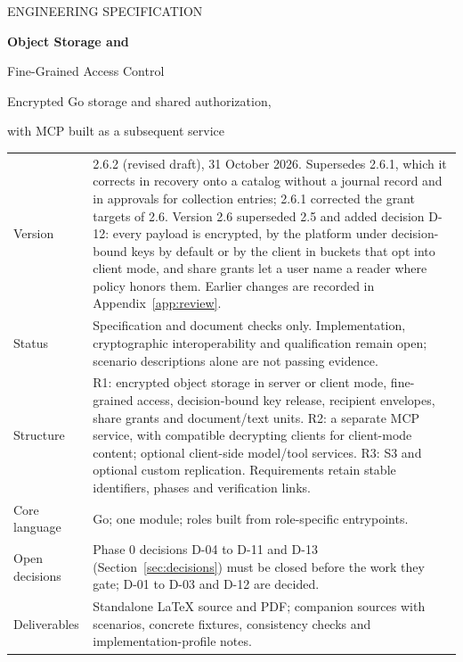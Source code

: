 \documentclass[11pt,a4paper]{article}
\begin{document}
\begin{titlepage}
\vspace*{15mm}
{\color{accent}\large ENGINEERING SPECIFICATION\par}
\vspace{8mm}
{\color{ink}\Huge\bfseries Object Storage and\par Fine-Grained Access Control\par}
\vspace{7mm}
{\LARGE Encrypted Go storage and shared authorization,\par with MCP built as a subsequent service\par}
\vspace{15mm}
\begin{tabularx}{\textwidth}{@{}P{34mm}Y@{}}
\toprule
Version & 2.6.2 (revised draft), 31 October 2026. Supersedes 2.6.1, which it corrects in recovery onto a catalog without a journal record and in approvals for collection entries; 2.6.1 corrected the grant targets of 2.6. Version 2.6 superseded 2.5 and added decision D-12: every payload is encrypted, by the platform under decision-bound keys by default or by the client in buckets that opt into client mode, and share grants let a user name a reader where policy honors them. Earlier changes are recorded in Appendix~\ref{app:review}.\\
Status & Specification and document checks only. Implementation, cryptographic interoperability and qualification remain open; scenario descriptions alone are not passing evidence.\\
Structure & R1: encrypted object storage in server or client mode, fine-grained access, decision-bound key release, recipient envelopes, share grants and document/text units. R2: a separate MCP service, with compatible decrypting clients for client-mode content; optional client-side model/tool services. R3: S3 and optional custom replication. Requirements retain stable identifiers, phases and verification links.\\
Core language & Go; one module; roles built from role-specific entrypoints.\\
Open decisions & Phase 0 decisions D-04 to D-11 and D-13 (Section~\ref{sec:decisions}) must be closed before the work they gate; D-01 to D-03 and D-12 are decided.\\
Deliverables & Standalone LaTeX source and PDF; companion sources with scenarios, concrete fixtures, consistency checks and implementation-profile notes.\\
\bottomrule
\end{tabularx}\par

\end{titlepage}
\end{document}
